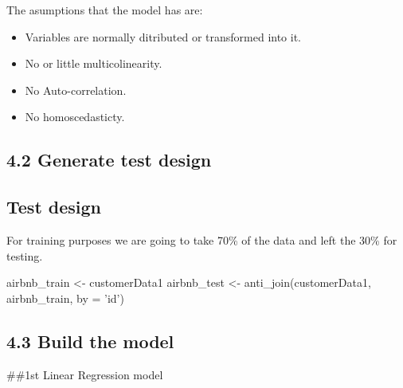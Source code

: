 The asumptions that the model has are:

\begin{itemize}
\tightlist
\item
  Variables are normally ditributed or transformed into it.
\item
  No or little multicolinearity.
\item
  No Auto-correlation.
\item
  No homoscedasticty.
\end{itemize}

\hypertarget{generate-test-design}{%
\subsection{4.2 Generate test design}\label{generate-test-design}}

\hypertarget{test-design}{%
\subsection{Test design}\label{test-design}}

For training purposes we are going to take 70\% of the data and left the
30\% for testing.

\begin{Schunk}
\begin{Sinput}
airbnb_train <- customerData1 %
airbnb_test  <- anti_join(customerData1, airbnb_train, by = 'id') %
\end{Sinput}
\end{Schunk}

\hypertarget{build-the-model}{%
\subsection{4.3 Build the model}\label{build-the-model}}

\#\#1st Linear Regression model

